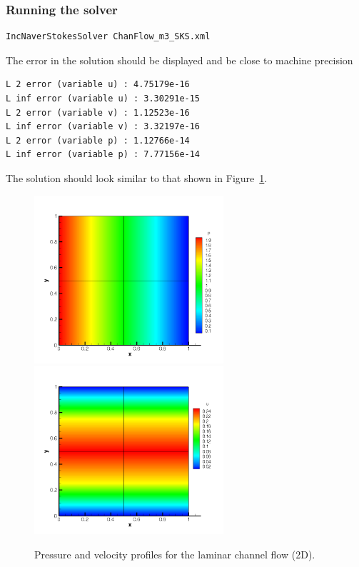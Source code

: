 \subsubsection{Running the solver}
\begin{lstlisting}[style=BashInputStyle]
IncNaverStokesSolver ChanFlow_m3_SKS.xml
\end{lstlisting}

The error in the solution should be displayed and be close to machine precision
\begin{lstlisting}[style=BashInputStyle]
L 2 error (variable u) : 4.75179e-16
L inf error (variable u) : 3.30291e-15
L 2 error (variable v) : 1.12523e-16
L inf error (variable v) : 3.32197e-16
L 2 error (variable p) : 1.12766e-14
L inf error (variable p) : 7.77156e-14
\end{lstlisting}

The solution should look similar to that shown in
Figure~\ref{f:incns:laminar2d}.

\begin{figure}
\begin{center}
\includegraphics[width=7cm]{img/CF2DSKP3PR.png}
\includegraphics[width=7cm]{img/CF2DSKP3.png}
\caption{Pressure and velocity profiles for the laminar channel flow (2D).}
\label{f:incns:laminar2d}
\end{center}
\end{figure}




